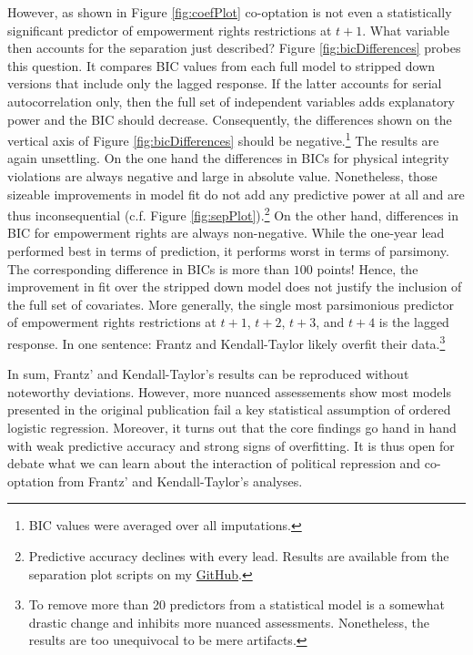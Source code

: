 However, as shown in Figure \ref{fig:coefPlot} co-optation
is not even a statistically significant predictor of
empowerment rights restrictions at $t+1$. What
variable then accounts for the separation just described? 
Figure \ref{fig:bicDifferences} probes this question. It
compares BIC values from each full model to stripped down 
versions that include only the lagged response. If the 
latter accounts for serial autocorrelation only, then 
the full set of independent variables adds explanatory 
power and the BIC should decrease. Consequently, the 
differences shown on the vertical axis of Figure 
\ref{fig:bicDifferences} should be negative.\footnote{BIC 
values were averaged over all imputations.} The results are 
again unsettling. On the one hand the differences in BICs 
for physical integrity violations are always negative and 
large in absolute value. Nonetheless, those sizeable 
improvements in model fit do not add any predictive power at
all and are thus inconsequential (c.f. Figure 
\ref{fig:sepPlot}).\footnote{Predictive accuracy declines 
with every lead. Results are available from the separation
plot scripts on my \href{https://github.com/dagtann/mleTermpaper/tree/master/R/original/onHold}{GitHub}.} On 
the other hand, differences in BIC for empowerment rights 
are always non-negative. While the one-year lead performed 
best in terms of prediction, it performs worst in terms of 
parsimony. The corresponding difference in BICs is more than
$100$ points! Hence, the improvement in fit over the 
stripped down model does not justify the inclusion of the 
full set of covariates. More generally, the single most
parsimonious predictor of empowerment rights restrictions at 
$t+1$, $t+2$, $t+3$, and $t+4$ is the lagged response. In one 
sentence: Frantz and Kendall-Taylor likely overfit their 
data.\footnote{To remove more than 20 predictors from a 
statistical model is a somewhat drastic change  and inhibits 
more nuanced assessments. Nonetheless, the results are too 
unequivocal to be mere artifacts.}

In sum, Frantz' and Kendall-Taylor's results can be 
reproduced without noteworthy deviations. However, more 
nuanced assessements show most models presented 
in the original publication fail a key statistical 
assumption of ordered logistic regression. Moreover, it 
turns out that the core findings go hand in hand with weak 
predictive accuracy and strong signs of overfitting. It is 
thus open for debate what we can learn about the 
interaction of political repression and co-optation from
Frantz' and Kendall-Taylor's analyses.